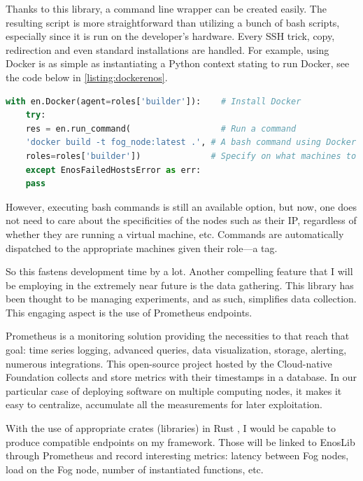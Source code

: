 Thanks to this library, a command line wrapper can be created easily. The resulting script is more straightforward than utilizing a bunch of bash scripts, especially since it is run on the developer's hardware. Every SSH trick, copy, redirection and even standard installations are handled. For example, using Docker is as simple as instantiating a Python context stating to run Docker, see the code below in \cref{listing:dockerenos}.

\begin{lstlisting}[language=Python, caption=EnosLib context example with Docker, label=listing:dockerenos]
	with en.Docker(agent=roles['builder']):    # Install Docker
	try:
	res = en.run_command(                  # Run a command
	'docker build -t fog_node:latest .', # A bash command using Docker
	roles=roles['builder'])              # Specify on what machines to act on
	except EnosFailedHostsError as err:
	pass
\end{lstlisting}

However, executing bash commands is still an available option, but now, one does not need to care about the specificities of the nodes such as their IP, regardless of whether they are running a virtual machine, etc. Commands are automatically dispatched to the appropriate machines given their role—a tag.

So this fastens development time by a lot. Another compelling feature that I will be employing in the extremely near future is the data gathering. This library has been thought to be managing experiments, and as such, simplifies data collection. This engaging aspect is the use of Prometheus endpoints.

Prometheus \cite{prometheus_authors_prometheus_nodate} is a monitoring solution providing the necessities to that reach that goal: time series logging, advanced queries, data visualization, storage, alerting, numerous integrations. This open-source project hosted by the Cloud-native Foundation collects and store metrics with their timestamps in a database. In our particular case of deploying software on multiple computing nodes, it makes it easy to centralize, accumulate all the measurements for later exploitation.

With the use of appropriate crates (libraries) in Rust \cite{sully_rocket_prometheus_2022}, I would be capable to produce compatible endpoints on my framework. Those will be linked to EnosLib through Prometheus and record interesting metrics: latency between Fog nodes, load on the Fog node, number of instantiated functions, etc.

